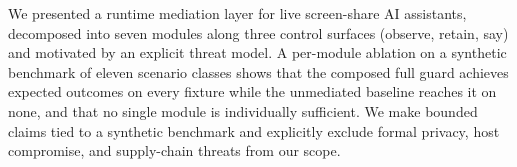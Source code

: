 \documentclass[sn-mathphys-num]{sn-jnl}
\begin{document}
We presented a runtime mediation layer for live screen-share AI assistants,
decomposed into seven modules along three control surfaces (observe, retain,
say) and motivated by an explicit threat model.
A per-module ablation on a synthetic benchmark of eleven scenario classes shows
that the composed full guard achieves expected outcomes on every fixture while
the unmediated baseline reaches it on none, and that no single module is
individually sufficient.
We make bounded claims tied to a synthetic benchmark and explicitly exclude
formal privacy, host compromise, and supply-chain threats from our scope.




\end{document}
